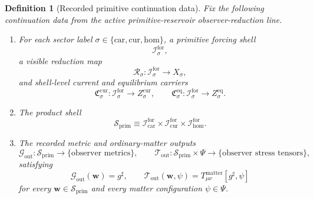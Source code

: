\documentclass[11pt]{article}
\newcommand{\CompletedMetric}{g^{\sharp}}
\newcommand{\MatterSpace}{\Psi}
\newcommand{\Car}{\mathrm{car}}
\newcommand{\Cur}{\mathrm{cur}}
\newcommand{\Hom}{\mathrm{hom}}
\newcommand{\ForSpace}[1]{\mathcal I_{#1}^{\mathrm{for}}}
\newcommand{\PrimShell}{\mathcal S_{\mathrm{prim}}}
\newcommand{\Reduction}[1]{\mathcal R_{#1}}
\newcommand{\CurrentCarrier}[1]{\mathfrak C_{#1}^{\mathrm{cur}}}
\newcommand{\EqCarrier}[1]{\mathfrak C_{#1}^{\mathrm{eq}}}
\newcommand{\MetricOut}{\mathscr G_{\mathrm{out}}}
\newcommand{\MatterOut}{\mathscr T_{\mathrm{out}}}
\newtheorem{definition}{Definition}
\begin{document}
\begin{definition}[Recorded primitive continuation data]
\label{def:fixed}
Fix the following continuation data from the active primitive-reservoir observer-reduction line.
\begin{enumerate}
    \item For each sector label \(\sigma\in\{\Car,\Cur,\Hom\}\), a primitive forcing shell
    \[
    \ForSpace{\sigma},
    \]
    a visible reduction map
    \[
    \Reduction{\sigma}:\ForSpace{\sigma}\to X_{\sigma},
    \]
    and shell-level current and equilibrium carriers
    \[
    \CurrentCarrier{\sigma}:\ForSpace{\sigma}\to Z_{\sigma}^{\mathrm{cur}},
    \qquad
    \EqCarrier{\sigma}:\ForSpace{\sigma}\to Z_{\sigma}^{\mathrm{eq}}.
    \]
    \item The product shell
    \[
    \PrimShell
    \equiv
    \ForSpace{\Car}\times \ForSpace{\Cur}\times \ForSpace{\Hom}.
    \]
    \item The recorded metric and ordinary-matter outputs
    \[
    \MetricOut:\PrimShell\to\{\text{observer metrics}\},
    \qquad
    \MatterOut:\PrimShell\times\MatterSpace\to\{\text{observer stress tensors}\},
    \]
    satisfying
    \begin{equation}
    \MetricOut(\mathbf w)=\CompletedMetric,
    \qquad
    \MatterOut(\mathbf w,\psi)
    =
    T_{\mu\nu}^{\mathrm{matter}}[\CompletedMetric,\psi]
    \label{eq:fixedoutputs}
    \end{equation}
    for every \(\mathbf w\in\PrimShell\) and every matter configuration \(\psi\in\MatterSpace\).
\end{enumerate}
\end{definition}
\end{document}
